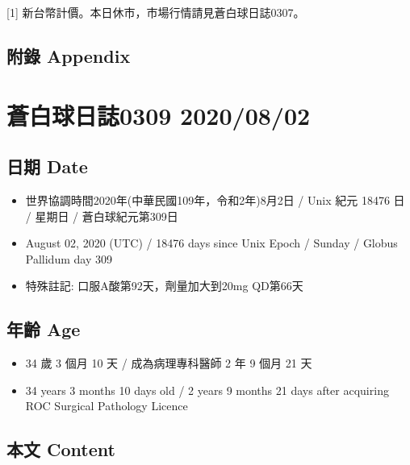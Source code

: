 \documentclass[a5paper, 11pt
]{book}
\providecommand{\tightlist}{%
  \setlength{\itemsep}{0pt}\setlength{\parskip}{0pt}}
\begin{document}
{[}1{]} 新台幣計價。本日休市，市場行情請見蒼白球日誌0307。

\hypertarget{ux9644ux9304-appendix-61}{%
\subsection{附錄 Appendix}\label{ux9644ux9304-appendix-61}}

\hypertarget{ux84bcux767dux7403ux65e5ux8a8c0309-20200802}{%
\section{蒼白球日誌0309
2020/08/02}\label{ux84bcux767dux7403ux65e5ux8a8c0309-20200802}}

\hypertarget{ux65e5ux671f-date-62}{%
\subsection{日期 Date}\label{ux65e5ux671f-date-62}}

\begin{itemize}
\tightlist
\item
  世界協調時間2020年(中華民國109年，令和2年)8月2日 / Unix 紀元 18476 日
  / 星期日 / 蒼白球紀元第309日
\item
  August 02, 2020 (UTC) / 18476 days since Unix Epoch / Sunday / Globus
  Pallidum day 309
\item
  特殊註記: 口服A酸第92天，劑量加大到20mg QD第66天
\end{itemize}

\hypertarget{ux5e74ux9f61-age-62}{%
\subsection{年齡 Age}\label{ux5e74ux9f61-age-62}}

\begin{itemize}
\tightlist
\item
  34 歲 3 個月 10 天 / 成為病理專科醫師 2 年 9 個月 21 天
\item
  34 years 3 months 10 days old / 2 years 9 months 21 days after
  acquiring ROC Surgical Pathology Licence
\end{itemize}

\hypertarget{ux672cux6587-content-62}{%
\subsection{本文 Content}\label{ux672cux6587-content-62}}
\end{document}
